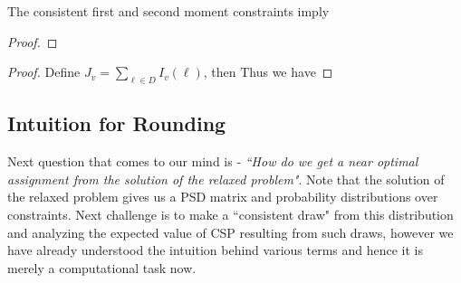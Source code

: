 \begin{remark}
The consistent first and second moment constraints imply 
\end{remark}
\begin{proof}
\end{proof}
\begin{remark}
\end{remark}
\begin{proof}
Define $J_v = \sum_{\ell \in D} I_v(\ell)$, then 
Thus we have 
\end{proof}

\subsection{Intuition for Rounding}
Next question that comes to our mind is - 
\textit{``How do we get a near optimal assignment from the solution of the relaxed problem"}. 
Note that the solution of the relaxed problem gives us a PSD matrix and probability distributions over constraints. 
Next challenge is to make a ``consistent draw" from this distribution and analyzing the expected value of CSP resulting from such draws, 
however we have already understood the intuition behind various terms and hence it is merely a computational task now.  

